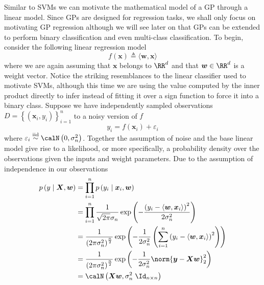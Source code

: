 Similar to SVMs we can motivate the mathematical model of a GP through a linear model. Since GPs are designed for regression tasks, we shall only focus on motivating GP regression although we will see later on that GPs can be extended to perform binary classification and even multi-class classification. To begin, consider the following linear regression model
\begin{equation} \label{eq: gp_lin_reg_base}
    f \left( \bm{x} \right) \triangleq \langle \bm{w} , \bm{x} \rangle
\end{equation}
where we are again assuming that $\bm{x}$ belongs to $\RR^d$ and that $\bm{w} \in \RR^d$ is a weight vector. Notice the striking resemblances to the linear classifier used to motivate SVMs, although this time we are using the value computed by the inner product directly to infer instead of fitting it over a sign function to force it into a binary class. Suppose we have independently sampled observations $D = \left\{ \left( \bm{x}_i , y_i \right) \right\}_{i=1}^{n}$ to a noisy version of $f$
\[
    y_i = f \left( \bm{x}_i \right) + \varepsilon_i
\]
where $\varepsilon_i \overset{\text{iid}}{\sim} \calN \left( 0 , \sigma_n^2 \right) $. Together the assumption of noise and the base linear model give rise to a likelihood, or more specifically, a probability density over the observations given the inputs and weight parameters. Due to the assumption of independence in our observations
\begin{align} \label{eq: y_cond_X_w}
    p \left( y \mid \bm{X}, \bm{w} \right)
     & = \prod_{i=1}^{n} p \left( y_i \mid \bm{x}_i , \bm{w} \right)                                                                                                                                 \\ \nonumber
     & = \prod_{i=1}^{n} \frac{1}{\sqrt{2 \pi} \sigma_n} \exp \left( - \frac{\left( y_i - \langle \bm{w} , \bm{x}_i \rangle \right)^2}{2 \sigma_n^2} \right)                                         \\ \nonumber
     & = \frac{1}{\left( 2 \pi \sigma_n^2 \right)^{\frac{n}{2}}} \exp \left( - \frac{1}{2 \sigma_n^2} \left( \sum_{i=1}^{n} \left( y_i - \langle \bm{w} , \bm{x}_i \rangle \right)^2 \right) \right) \\ \nonumber
     & = \frac{1}{\left( 2 \pi \sigma_n^2 \right)^{\frac{n}{2}}} \exp \left( - \frac{1}{2 \sigma_n^2} \norm{\bm{y} - \bm{X} \bm{w}}^2_2 \right)                                                      \\ \nonumber
     & = \calN \left( \bm{X} \bm{w} , \sigma_n^2 \; \Id_{n \times n} \right)
\end{align}

